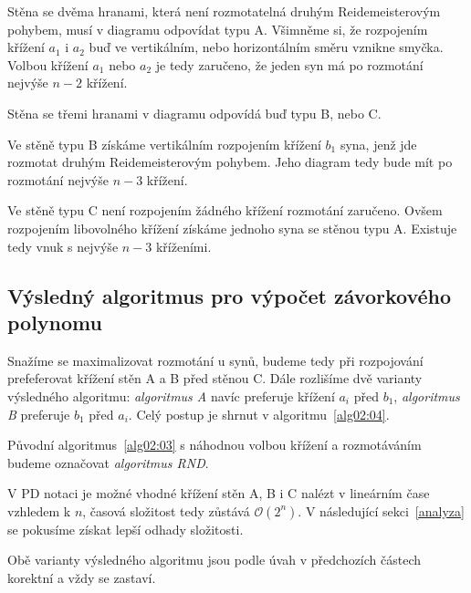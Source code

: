 Stěna se dvěma hranami, která není rozmotatelná druhým Reidemeisterovým pohybem, musí v diagramu odpovídat typu A. Všimněme si, že rozpojením křížení $a_1$ i $a_2$ buď ve vertikálním, nebo horizontálním směru vznikne smyčka. Volbou křížení $a_1$ nebo $a_2$ je tedy zaručeno, že jeden syn má po rozmotání nejvýše $n-2$ křížení.

Stěna se třemi hranami v diagramu odpovídá buď typu B, nebo C.

Ve stěně typu B získáme vertikálním rozpojením křížení $b_1$ syna, jenž jde rozmotat druhým Reidemeisterovým pohybem. Jeho diagram tedy bude mít po rozmotání nejvýše $n-3$ křížení.

Ve stěně typu C není rozpojením žádného křížení rozmotání zaručeno. Ovšem rozpojením libovolného křížení získáme jednoho syna se stěnou typu A. Existuje tedy vnuk s nejvýše $n-3$ kříženími.

\subsection{Výsledný algoritmus pro výpočet závorkového polynomu} \label{varianty}
Snažíme se maximalizovat rozmotání u synů, budeme tedy při rozpojování prefeferovat křížení stěn A a B před stěnou C. Dále rozlišíme dvě varianty výsledného algoritmu: \emph{algoritmus A} navíc preferuje křížení $a_i$ před $b_1$,  \emph{algoritmus B} preferuje $b_1$ před $a_i$. Celý postup je shrnut v algoritmu~\ref{alg02:04}.

Původní algoritmus~\ref{alg02:03} s náhodnou volbou křížení a rozmotáváním budeme označovat \emph{algoritmus RND}.

V PD notaci je možné vhodné křížení stěn A, B i C nalézt v lineárním čase vzhledem k $n$, časová složitost tedy zůstává $\mathcal{O}(2^n)$. V následující sekci~\ref{analyza} se pokusíme získat lepší odhady složitosti.

Obě varianty výsledného algoritmu jsou podle úvah v předchozích částech korektní a vždy se zastaví.

